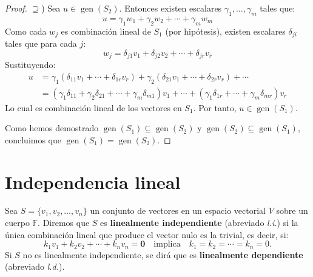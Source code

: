 \begin{proof}
$\supseteq$) Sea $u \in \operatorname{gen}(S_2)$. Entonces existen escalares $\gamma_1, \dots, \gamma_m$ tales que:
\[u = \gamma_1 w_1 + \gamma_2 w_2 + \cdots + \gamma_m w_m\]
Como cada $w_j$ es combinación lineal de $S_1$ (por hipótesis), existen escalares $\delta_{ji}$ tales que para cada $j$:
\[w_j = \delta_{j1} v_1 + \delta_{j2} v_2 + \cdots + \delta_{jr} v_r\]
Sustituyendo:
\begin{align*}
u &= \gamma_1 (\delta_{11} v_1 + \cdots + \delta_{1r} v_r) + \gamma_2 (\delta_{21} v_1 + \cdots + \delta_{2r} v_r) + \cdots \\
&= (\gamma_1 \delta_{11} + \gamma_2 \delta_{21} + \cdots + \gamma_m \delta_{m1}) v_1 + \cdots + (\gamma_1 \delta_{1r} + \cdots + \gamma_m \delta_{mr}) v_r
\end{align*}
Lo cual es combinación lineal de los vectores en $S_1$. Por tanto, $u \in \operatorname{gen}(S_1)$.

Como hemos demostrado $\operatorname{gen}(S_1) \subseteq \operatorname{gen}(S_2)$ y $\operatorname{gen}(S_2) \subseteq \operatorname{gen}(S_1)$, concluimos que $\operatorname{gen}(S_1) = \operatorname{gen}(S_2)$.
\end{proof}

\section{Independencia lineal}

\begin{definition}
Sea $S = \{v_1, v_2, \dots, v_n\}$ un conjunto de vectores en un espacio vectorial $V$ sobre un cuerpo $\mathbb{F}$. Diremos que $S$ es \textbf{linealmente independiente} (abreviado \textit{l.i.}) si la única combinación lineal que produce el vector nulo es la trivial, es decir, si:
$$k_1v_1 + k_2v_2 + \cdots + k_nv_n = \mathbf{0} \quad \text{implica} \quad k_1 = k_2 = \cdots = k_n = 0.$$
Si $S$ no es linealmente independiente, se dirá que es \textbf{linealmente dependiente} (abreviado \textit{l.d.}).
\end{definition}

